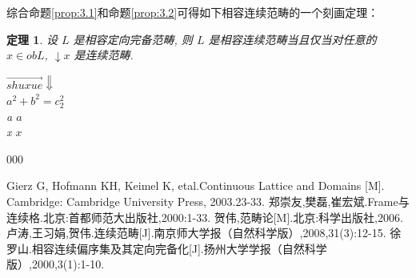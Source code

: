 \documentclass[c5size,a4paper,hyperref,fancyhdr,UTF8,fontset=fandol]{ctexart}
\theoremstyle{nonumberplain}
\newtheorem{theorem}[definition]{定理}
\theoremstyle{nonumberplain}
\begin{document}
综合命题\ref{prop:3.1}和命题\ref{prop:3.2}可得如下相容连续范畴的一个刻画定理：

\begin{theorem}
    设 $L$ 是相容定向完备范畴, 则 $L$ 是相容连续范畴当且仅当对任意的 $x\in obL$, $\downarrow x$ 是连续范畴.

    $\overrightarrow{shuxue}  \Downarrow$\\
    \indent $a^{2}+b^{2}=c_{2}^{2}$\\
    \indent a   $a$\\
    \indent x   $x$
\end{theorem}

\begin{thebibliography}{000}

   Gierz G, Hofmann KH, Keimel K, etal.Continuous Lattice and Domains [M]. Cambridge: Cambridge University Press, 2003.23-33.
   郑崇友,樊磊,崔宏斌.Frame与连续格.北京:首都师范大出版社,2000:1-33.
   贺伟,范畴论[M].北京:科学出版社,2006.
   卢涛,王习娟,贺伟.连续范畴[J].南京师大学报（自然科学版）,2008,31(3):12-15.
   徐罗山.相容连续偏序集及其定向完备化[J].扬州大学学报（自然科学版）,2000,3(1):1-10.
\end{thebibliography}
\end{document}
